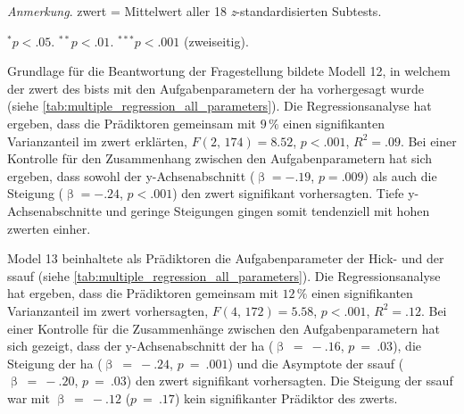 \documentclass[11pt, twoside, a4paper]{book}		%
\begin{document}
\begin{table}[b]
\begin{adjustbox}{width=1\textwidth}
\begin{threeparttable}
			\begin{tablenotes}[flushleft]
				\footnotesize				%
				\setlength{}	%
				\item \textit{Anmerkung}. \gls{zwert} = Mittelwert aller 18 \textit{z}-standardisierten Subtests.
				\item {$^{*}$}$p<.05$. {$^{**}$}$p<.01$. {$^{***}$}$p<.001$ (zweiseitig).
			\end{tablenotes}
		\end{threeparttable}
	\end{adjustbox}
\end{table}

Grundlage für die Beantwortung der Fragestellung bildete Modell 12, in welchem der \gls{zwert} des \gls{bist}s mit den Aufgabenparametern der \gls{ha} vorhergesagt wurde (siehe \autoref{tab:multiple_regression_all_parameters}).
Die Regressionsanalyse hat ergeben, dass die Prädiktoren gemeinsam mit $9\,\%$ einen signifikanten Varianzanteil im \gls{zwert} erklärten, $F(2,\,174)=8.52$, $p<.001$, $R^2=.09$. Bei einer Kontrolle für den Zusammenhang zwischen den Aufgabenparametern hat sich ergeben, dass sowohl der y-Ach\-sen\-ab\-schnitt ($\upbeta=-.19$, $p=.009$) als auch die Steigung ($\upbeta=-.24$, $p<.001$) den \gls{zwert} signifikant vorhersagten. Tiefe y-Ach\-sen\-ab\-schnitte und geringe Steigungen gingen somit tendenziell mit hohen \gls{zwert}en einher.

Model 13 beinhaltete als Prädiktoren die Aufgabenparameter der Hick- und der \gls{ssauf} (siehe \autoref{tab:multiple_regression_all_parameters}). 
Die Regressionsanalyse hat ergeben, dass die Prädiktoren gemeinsam mit $12\,\%$ einen signifikanten Varianzanteil im \gls{zwert} vorhersagten, $F(4,\,172)=5.58$, $p<.001$, $R^2=.12$. Bei einer Kontrolle für die Zusammenhänge zwischen den Aufgabenparametern hat sich gezeigt, dass der y-Ach\-sen\-ab\-schnitt der \gls{ha}  ($\upbeta~=~-.16$, $p~=~.03$), die Steigung der \gls{ha} ($\upbeta~=~-.24$, $p~=~.001$) und die Asymptote der \gls{ssauf} ($\upbeta~=~-.20$, $p~=~.03$) den \gls{zwert} signifikant vorhersagten. Die Steigung der \gls{ssauf} war mit $\upbeta~=~-.12$ ($p~=~.17$) kein signifikanter Prädiktor des \gls{zwert}s.
\end{document}
